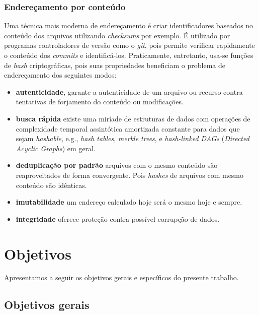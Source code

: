 \subsection{Endereçamento por conteúdo}

Uma técnica mais moderna de endereçamento é criar identificadores baseados no conteúdo dos arquivos utilizando \textit{checksums} por exemplo.
É utilizado por programas controladores de versão como o \textit{git}, pois permite verificar rapidamente o conteúdo dos \textit{commits} e identificá-los.
Praticamente, entretanto, usa-se funções de \textit{hash} criptográficas, pois suas propriedades beneficiam o problema de endereçamento dos seguintes modos:

\begin{itemize}
    \item \textbf{autenticidade}, garante a autenticidade de um arquivo ou recurso contra tentativas de forjamento do conteúdo ou modificações.
    \item \textbf{busca rápida} existe uma miríade de estruturas de dados com operações de complexidade temporal assintótica amortizada constante para dados que sejam \textit{hashable}, e.g., \textit{hash tables}, \textit{merkle trees}, e \textit{hash-linked DAGs} (\textit{Directed Acyclic Graphs}) em geral.
    \item \textbf{deduplicação por padrão} arquivos com o mesmo conteúdo são reaproveitados de forma convergente.
    Pois \textit{hashes} de arquivos com mesmo conteúdo são idênticas.
    \item \textbf{imutabilidade} um endereço calculado hoje será o mesmo hoje e sempre.
    \item \textbf{integridade} oferece proteção contra possível corrupção de dados.
\end{itemize}

\chapter{Objetivos}

Apresentamos a seguir os objetivos gerais e específicos do presente trabalho.

\section{Objetivos gerais}

